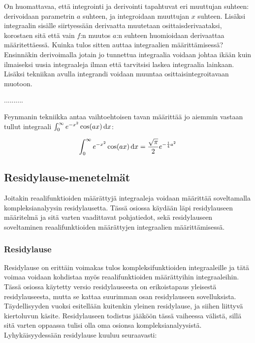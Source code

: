 \documentclass[../integrointiopas.tex]{subfiles}
\begin{document}
	On huomattavaa, että integrointi ja derivointi tapahtuvat eri muuttujan suhteen: derivoidaan parametrin $a$ suhteen, ja integroidaan muuttujan $x$ suhteen. Lisäksi integraalin sisälle siirtyessään derivaatta muutetaan osittaisderivaataksi, korostaen sitä että vain $f$:n muutos $a$:n suhteen huomioidaan derivaattaa määritettäessä. Kuinka tulos sitten auttaa integraalien määrittämisessä? Ensinnäkin derivoimalla jotain jo tunnettua integraalia voidaan johtaa ikään kuin ilmaiseksi uusia integraaleja ilman että tarvitsisi laskea integraalia lainkaan. Lisäksi tekniikan avulla integrandi voidaan muuntaa osittaisintegroitavaan muotoon.
	
	..........
	
	Feynmanin tekniikka antaa vaihtoehtoisen tavan määrittää jo aiemmin vastaan tullut integraali $\int_{0}^{\infty}e^{-x^2}\cos(ax)\odif{x}$:
	
	\begin{equation}
		\int_{0}^{\infty}e^{-x^2}\cos(ax)\odif{x} = \frac{\sqrt{\pi}}{2}e^{-\frac{1}{4}a^2}
	\end{equation}
	
	\subsection{Residylause-menetelmät}
	
	Joitakin reaalifunktioiden määrättyjä integraaleja voidaan määrittää soveltamalla kompleksianalyysin residylausetta. Tässä osiossa käydään läpi residylauseen määritelmä ja sitä varten vaadittavat pohjatiedot, sekä residylauseen soveltaminen reaalifunktioiden määrättyjen integraalien määrittämisessä. 
	
	\subsubsection{Residylause}
	Residylause on erittäin voimakas tulos kompleksifunktioiden integraaleille ja tätä voimaa voidaan kohdistaa myös reaalifunktioiden määrättyihin integraaleihin. Tässä osiossa käytetty versio residylauseesta on erikoistapaus yleisestä residylauseesta, mutta se kattaa suurimman osan residylauseen sovelluksista. Täydellisyyden vuoksi esitellään kuitenkin yleinen residylause, ja siihen liittyvä kiertoluvun käsite. Residylauseen todistus jääköön tässä vaiheessa välistä, sillä sitä varten oppaassa tulisi olla oma osionsa kompleksianalyysistä. Lyhykäisyydessään residylause kuuluu seuraavasti:
	
\end{document}
